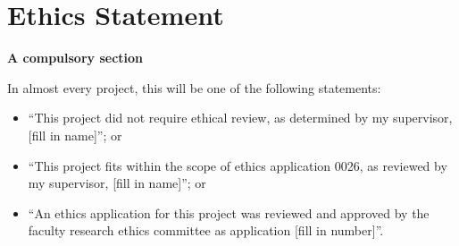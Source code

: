 \documentclass[ oneside,%
                    author={Joshua Felmeden},
                    degree={MEng},
                     title={Semantic Analysis of Financial Headlines Based on Realised Stock Returns},
                  subtitle={}]{dissertation}
\begin{document}





\makedecl





\tableofcontents
\listoffigures
\listoftables




\chapter*{Ethics Statement}

{\bf A compulsory section} 
\vspace{1cm} 

In almost every project, this will be one of the following statements:
    \begin{itemize}
        \item ``This project did not require ethical review, as determined by my supervisor, [fill in name]''; or
        \item ``This project fits within the scope of ethics application 0026, as reviewed by my supervisor, [fill in name]''; or
        \item ``An ethics application for this project was reviewed and approved by the faculty research ethics committee as application [fill in number]''.
    \end{itemize}
    
\end{document}

